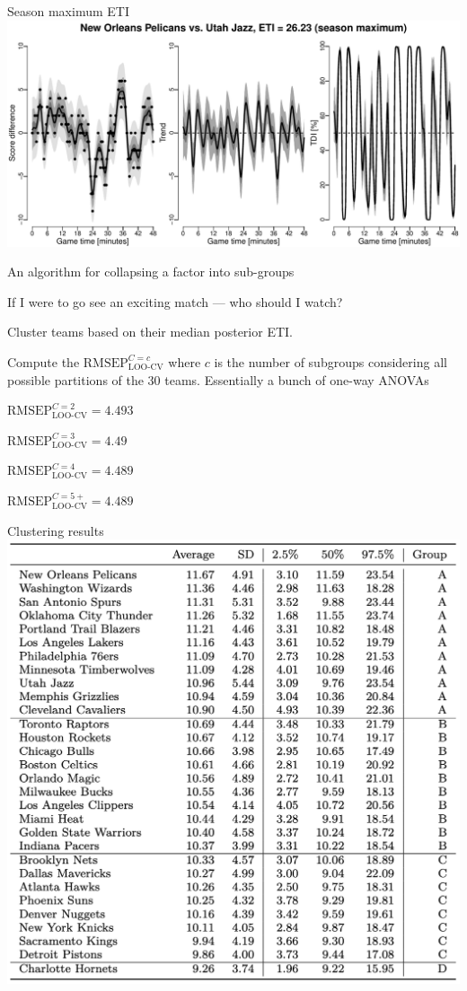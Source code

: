 \documentclass[ignorenonframetext,xcolor=pdflatex,table,dvipsnames,serif]{beamer}
\begin{document}
\begin{frame}{Season maximum ETI}
\includegraphics[scale=0.5]{fig4_5.pdf}
\end{frame}



\begin{frame}{An algorithm for collapsing a factor into sub-groups}

  If I were to go see an exciting match --- who should I watch?

  \pause

  Cluster teams based on their median posterior ETI. 

  Compute the $\text{RMSEP}_\text{LOO-CV}^{C=c}$ where $c$ is the number
  of subgroups considering all possible partitions of the 30 teams.
  Essentially a bunch of one-way ANOVAs


  $\text{RMSEP}_\text{LOO-CV}^{C=2} = 4.493$

  $\text{RMSEP}_\text{LOO-CV}^{C=3} = 4.49$

  $\text{RMSEP}_\text{LOO-CV}^{C=4} = 4.489$

  $\text{RMSEP}_\text{LOO-CV}^{C=5+} = 4.489$

  
\end{frame}


\begin{frame}{Clustering results}
\center\includegraphics[scale=0.4]{tab1.png}
\end{frame}
\end{document}
